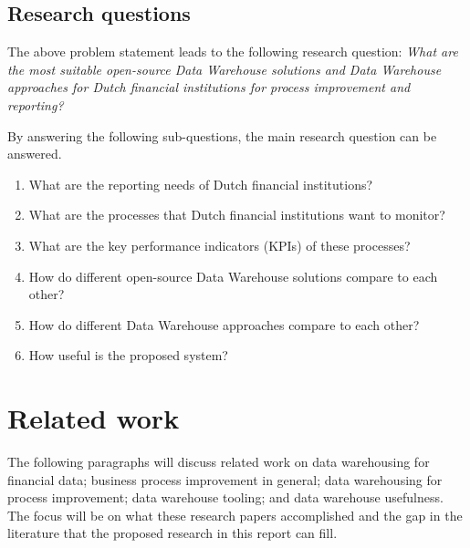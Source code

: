 \documentclass[11pt]{article}
\begin{document}

\subsection{Research questions}
The above problem statement leads to the following research question: 
\textit{What are the most suitable open-source Data Warehouse solutions and Data Warehouse approaches for Dutch financial institutions for process improvement and reporting?}

By answering the following sub-questions, the main research question can be answered.
\begin{enumerate}
  \item What are the reporting needs of Dutch financial institutions?
  \item What are the processes that Dutch financial institutions want to monitor?
  \item What are the key performance indicators (KPIs) of these processes?
  \item How do different open-source Data Warehouse solutions compare to each other?
  \item How do different Data Warehouse approaches compare to each other?
  \item How useful is the proposed system? \label{rq:usefulness}
\end{enumerate}

\section{Related work}
\label{related}
The following paragraphs will discuss related work on data warehousing for financial data; business process improvement in general; data warehousing for process improvement; data warehouse tooling; and data warehouse usefulness. The focus will be on what these research papers accomplished and the gap in the literature that the proposed research in this report can fill. \\
\end{document}
